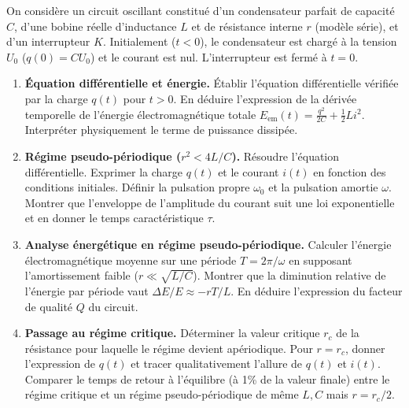 \documentclass[11pt]{article}
\begin{document}
\begin{exercice}
On considère un circuit oscillant constitué d'un condensateur parfait de capacité $C$, d'une bobine réelle d'inductance $L$ et de résistance interne $r$ (modèle série), et d'un interrupteur $K$. Initialement ($t<0$), le condensateur est chargé à la tension $U_0$ ($q(0)=CU_0$) et le courant est nul. L'interrupteur est fermé à $t=0$.

\begin{enumerate}
    \item \textbf{Équation différentielle et énergie.} Établir l'équation différentielle vérifiée par la charge $q(t)$ pour $t>0$. En déduire l'expression de la dérivée temporelle de l'énergie électromagnétique totale $E_{\text{em}}(t) = \frac{q^2}{2C} + \frac{1}{2}L i^2$. Interpréter physiquement le terme de puissance dissipée.
    \item \textbf{Régime pseudo-périodique ($r^2 < 4L/C$).} Résoudre l'équation différentielle. Exprimer la charge $q(t)$ et le courant $i(t)$ en fonction des conditions initiales. Définir la pulsation propre $\omega_0$ et la pulsation amortie $\omega$. Montrer que l'enveloppe de l'amplitude du courant suit une loi exponentielle et en donner le temps caractéristique $\tau$.
    \item \textbf{Analyse énergétique en régime pseudo-périodique.} Calculer l'énergie électromagnétique moyenne sur une période $T = 2\pi/\omega$ en supposant l'amortissement faible ($r \ll \sqrt{L/C}$). Montrer que la diminution relative de l'énergie par période vaut $\Delta E / E \approx - r T / L$. En déduire l'expression du facteur de qualité $Q$ du circuit.
    \item \textbf{Passage au régime critique.} Déterminer la valeur critique $r_c$ de la résistance pour laquelle le régime devient apériodique. Pour $r = r_c$, donner l'expression de $q(t)$ et tracer qualitativement l'allure de $q(t)$ et $i(t)$. Comparer le temps de retour à l'équilibre (à 1\% de la valeur finale) entre le régime critique et un régime pseudo-périodique de même $L, C$ mais $r = r_c/2$.
\end{enumerate}
\end{exercice}
\end{document}
